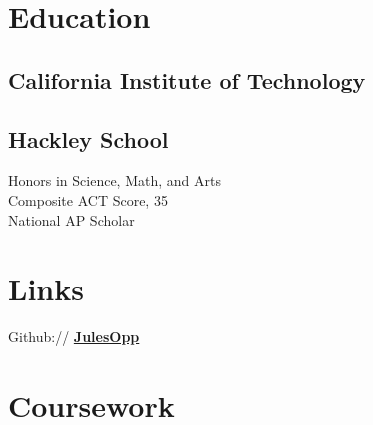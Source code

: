 \documentclass[letterpaper]{deedy-resume} %
\begin{document}
\begin{minipage}[t]{0.39\textwidth} %


\section{Education} 

\subsection{California Institute of \newline Technology}


\sectionspace %

\subsection{Hackley School}

Honors in Science, Math, and Arts \\
Composite ACT Score, 35 \\
National AP Scholar \\


\sectionspace %



\section{Links} 

Github:// \href{https://github.com/JulesOpp}{\bf JulesOpp} \\

\sectionspace %


\section{Coursework}


\end{minipage}
\end{document}
